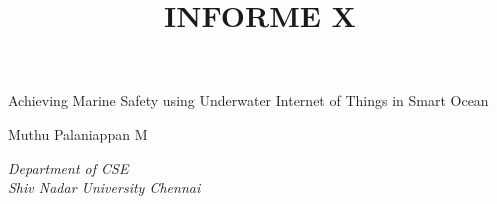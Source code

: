 \documentclass[a4paper,12pt]{article}
\title{INFORME X}
\begin{document}
\begin{center}
\Large{Achieving Marine Safety using Underwater Internet of Things in Smart Ocean}
\vspace{0.4cm}

\normalsize
Muthu Palaniappan M
\vspace{0.1cm}

\textit{\small{Department of CSE }\\
\small{Shiv Nadar University Chennai}}
\medskip

\normalsize

\end{center}

\medskip

\end{document}
